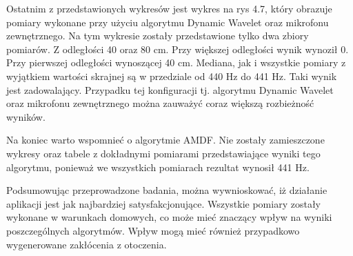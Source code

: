 \newpage
Ostatnim z przedstawionych wykresów jest wykres na rys 4.7, który obrazuje pomiary wykonane przy użyciu algorytmu Dynamic Wavelet oraz mikrofonu zewnętrznego. Na tym wykresie zostały przedstawione tylko dwa zbiory pomiarów. Z odległości 40 oraz 80 cm. Przy większej odległości wynik wynoził 0. Przy pierwszej odległości wynoszącej 40 cm. Mediana, jak i wszystkie pomiary z wyjątkiem wartości skrajnej są w przedziale od 440 Hz do 441 Hz. Taki wynik jest zadowalający. Przypadku tej konfiguracji tj. algorytmu Dynamic Wavelet oraz mikrofonu zewnętrznego można zauważyć coraz większą rozbieżność wyników.


Na koniec warto wspomnieć o algorytmie AMDF. Nie zostały zamieszczone wykresy oraz tabele z dokładnymi pomiarami przedstawiające wyniki tego algorytmu, ponieważ we wszystkich pomiarach rezultat wynosił 441 Hz.

Podsumowując przeprowadzone badania, można wywnioskować, iż działanie aplikacji jest jak najbardziej satysfakcjonujące. Wszystkie pomiary zostały wykonane w warunkach domowych, co może mieć znaczący wpływ na wyniki poszczególnych algorytmów. Wpływ mogą mieć również przypadkowo wygenerowane zakłócenia z otoczenia.
